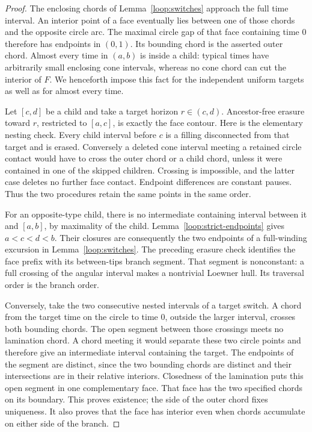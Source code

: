 \begin{proof}
The enclosing chords of Lemma~\ref{loop:switches} approach the full
time interval.  An interior point of a face eventually lies between
one of those chords and the opposite circle arc.  The maximal circle
gap of that face containing time $0$ therefore has endpoints in
$(0,1)$.  Its bounding chord is the asserted outer chord.  Almost every
time in $(a,b)$ is inside a child: typical times have arbitrarily small
enclosing cone intervals, whereas no cone chord can cut the interior
of $F$.  We henceforth impose this fact for the independent uniform
targets as well as for almost every time.

Let $[c,d]$ be a child and take a target horizon $r\in(c,d)$.
Ancestor-free erasure toward $r$, restricted to $[a,c]$, is exactly the
face contour.  Here is the elementary nesting check.  Every child
interval before $c$ is a filling disconnected from that target and is
erased.  Conversely a deleted cone interval meeting a retained circle
contact would have to cross the outer chord or a child chord, unless
it were contained in one of the skipped children.  Crossing is
impossible, and the latter case deletes no further face contact.
Endpoint differences are constant pauses.  Thus the two procedures
retain the same points in the same order.

For an opposite-type child, there is no intermediate containing
interval between it and $[a,b]$, by maximality of the child.
Lemma~\ref{loop:strict-endpoints} gives $a<c<d<b$.  Their
closures are consequently the two endpoints of a full-winding
excursion in Lemma~\ref{loop:switches}.  The preceding erasure check
identifies the face prefix with its between-tips branch segment.  That
segment is nonconstant: a full crossing of the angular interval makes
a nontrivial Loewner hull.  Its traversal order is the branch order.

Conversely, take the two consecutive nested intervals of a target
switch.  A chord from the target time on the circle to time $0$,
outside the larger interval, crosses both bounding chords.  The open
segment between those crossings meets no lamination chord.  A chord
meeting it would separate these two circle points and therefore give
an intermediate interval containing the target.  The endpoints of the
segment are distinct, since the two bounding chords are distinct and
their intersections are in their relative interiors.  Closedness of
the lamination puts this open segment in one complementary face.
That face has the two specified chords on its boundary.  This proves
existence; the side of the outer chord fixes uniqueness.  It also
proves that the face has interior even when chords accumulate on
either side of the branch.


\end{proof}
